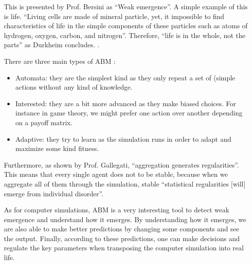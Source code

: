     This is presented by Prof. Bersini as ``Weak emergence''.\cite{ctaiABMBersini} A simple example of this is life. ``Living cells are made of mineral particle, yet, it impossible to find characteristics of life in the simple components of these particles such as atoms of hydrogen, oxygen, carbon, and nitrogen''. Therefore, ``life is in the whole, not the parts'' as Durkheim concludes. \cite{ctaiABMBersini}.

    There are three main types of ABM \cite{ctaiABMBersini} :

    \begin{itemize}
        \item Automata: they are the simplest kind as they only repeat a set of (simple actions without any kind of knowledge. 
        \item Interested: they are a bit more advanced as they make biased choices. For instance in game theory, we might prefer one action over another depending on a payoff matrix.
        \item Adaptive: they try to learn as the simulation runs in order to adapt and maximize some kind fitness.
    \end{itemize}

    Furthermore, as shown by Prof. Gallegati, ``aggregation generates regularities''. This means that every single agent does not to be stable, because when we aggregate all of them through the simulation, stable ``statistical regularities [will] emerge from individual disorder''. \cite{MauroGallegati}

    As for computer simulations, ABM is a very interesting tool to detect weak emergence and understand how it emerges. By understanding how it emerges, we are also able to make better predictions by changing some components and see the output. Finally, according to these predictions, one can make decisions and regulate the key parameters when transposing the computer simulation into real life. \cite{ctaiABMBersini}

